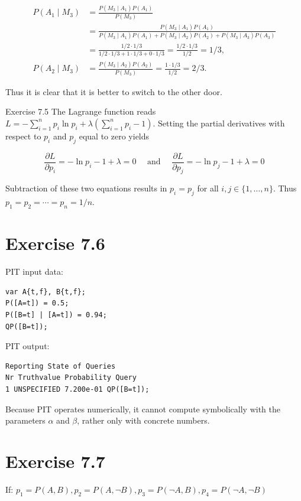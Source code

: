 \documentclass[10pt]{book}
\begin{document}
$$
\begin{aligned}
P\left(A_{1} \mid M_{3}\right) & =\frac{P\left(M_{3} \mid A_{1}\right) P\left(A_{1}\right)}{P\left(M_{3}\right)} \\
& =\frac{P\left(M_{3} \mid A_{1}\right) P\left(A_{1}\right)}{P\left(M_{3} \mid A_{1}\right) P\left(A_{1}\right)+P\left(M_{3} \mid A_{2}\right) P\left(A_{2}\right)+P\left(M_{3} \mid A_{3}\right) P\left(A_{3}\right)} \\
& =\frac{1 / 2 \cdot 1 / 3}{1 / 2 \cdot 1 / 3+1 \cdot 1 / 3+0 \cdot 1 / 3}=\frac{1 / 2 \cdot 1 / 3}{1 / 2}=1 / 3, \\
P\left(A_{2} \mid M_{3}\right) & =\frac{P\left(M_{3} \mid A_{2}\right) P\left(A_{2}\right)}{P\left(M_{3}\right)}=\frac{1 \cdot 1 / 3}{1 / 2}=2 / 3 .
\end{aligned}
$$

Thus it is clear that it is better to switch to the other door.

Exercise 7.5 The Lagrange function reads $L=-\sum_{i=1}^{n} p_{i} \ln p_{i}+\lambda\left(\sum_{i=1}^{n} p_{i}-1\right)$. Setting the partial derivatives with respect to $p_{i}$ and $p_{j}$ equal to zero yields

$$
\frac{\partial L}{\partial p_{i}}=-\ln p_{i}-1+\lambda=0 \quad \text { and } \quad \frac{\partial L}{\partial p_{j}}=-\ln p_{j}-1+\lambda=0
$$

Subtraction of these two equations results in $p_{i}=p_{j}$ for all $i, j \in\{1, \ldots, n\}$. Thus $p_{1}=p_{2}=\cdots=p_{n}=1 / n$.

\section*{Exercise 7.6}
PIT input data:

\begin{verbatim}
var A{t,f}, B{t,f};
P([A=t]) = 0.5;
P([B=t] | [A=t]) = 0.94;
QP([B=t]);
\end{verbatim}

PIT output:

\begin{verbatim}
Reporting State of Queries
Nr Truthvalue Probability Query
1 UNSPECIFIED 7.200e-01 QP([B=t]);
\end{verbatim}

Because PIT operates numerically, it cannot compute symbolically with the parameters $\alpha$ and $\beta$, rather only with concrete numbers.

\section*{Exercise 7.7}
If: $p_{1}=P(A, B), p_{2}=P(A, \neg B), p_{3}=P(\neg A, B), p_{4}=P(\neg A, \neg B)$
\end{document}
